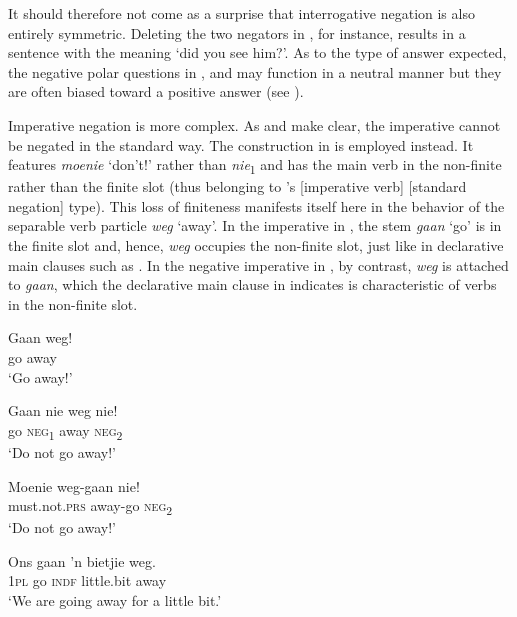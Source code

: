 \documentclass[output=paper,colorlinks,citecolor=brown]{langscibook}
\begin{document}
It should therefore not come as a surprise that interrogative negation is also entirely symmetric. Deleting the two negators in , for instance, results in a sentence with the meaning ‘did you see him?’. As to the type of answer expected, the negative polar questions in ,  and  may function in a neutral manner but they are often biased toward a positive answer (see \citealt[40]{Holmberg2016}).

Imperative negation is more complex. As  and  make clear, the imperative cannot be negated in the standard way. The construction in  is employed instead. It features \textit{moenie} ‘don’t!’ rather than \textit{nie}\textsubscript{1} and has the main verb in the non-finite rather than the finite slot (thus belonging to  \citeauthor{AuweraEtAl2013}'s \citeyear{AuweraEtAl2013}  [\textemdash imperative verb] [\textemdash standard negation] type). This loss of finiteness manifests itself here in the behavior of the separable verb particle \textit{weg} ‘away’. In the imperative in , the stem \textit{gaan} ‘go’ is in the finite slot and, hence, \textit{weg} occupies the non-finite slot, just like in declarative main clauses such as . In the negative imperative in , by contrast, \textit{weg} is attached to \textit{gaan}, which the declarative main clause in  indicates is characteristic of verbs in the non-finite slot.

\ea\label{ex:afr:11}
    
    \ea\label{ex:afr:11a}
        \gll Gaan weg! \\ 
             go away \\
        \glt ‘Go away!’
    
    \ex\label{ex:afr:11b}
        \gll *Gaan nie weg nie! \\
             go \textsc{neg}\textsubscript{1} away  \textsc{neg}\textsubscript{2} \\
        \glt ‘Do not go away!’
   
    \ex\label{ex:afr:11c}
        \gll Moenie weg-gaan nie! \\ 
             must.not.\textsc{prs} away-go    \textsc{neg}\textsubscript{2} \\
        \glt ‘Do not go away!’
    
    \ex\label{ex:afr:11d}
        \gll Ons gaan ’n bietjie weg. \\
             1\textsc{pl} go \textsc{indf} little.bit away \\
        \glt ‘We are going away for a little bit.’
    
\end{document}
